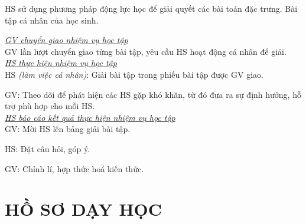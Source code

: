 {
HS sử dụng phương pháp động lực học để giải quyết các bài toán đặc trưng.
}
{
	Bài tập cá nhân của học sinh.
}
{
	\textit{\underline{GV chuyển giao nhiệm vụ học tập}}\\
	GV lần lượt chuyển giao từng bài tập, yêu cầu HS hoạt động cá nhân để giải.\\
	\textit{\underline{HS thực hiện nhiệm vụ học tập}}\\
	HS \textit{(làm việc cá nhân)}:  Giải bài tập trong phiếu bài tập được GV giao. 
	
	GV: Theo dõi để phát hiện các HS gặp khó khăn, từ đó đưa ra sự định hướng, hỗ trợ phù hợp cho mỗi HS.\\
	\textit{\underline{HS báo cáo kết quả thực hiện nhiệm vụ học tập}}\\
	GV: Mời HS lên bảng giải bài tập.
	
	HS: Đặt câu hỏi, góp ý.
	
	GV: Chỉnh lí, hợp thức hoá kiến thức.
}
\section{HỒ SƠ DẠY HỌC}
